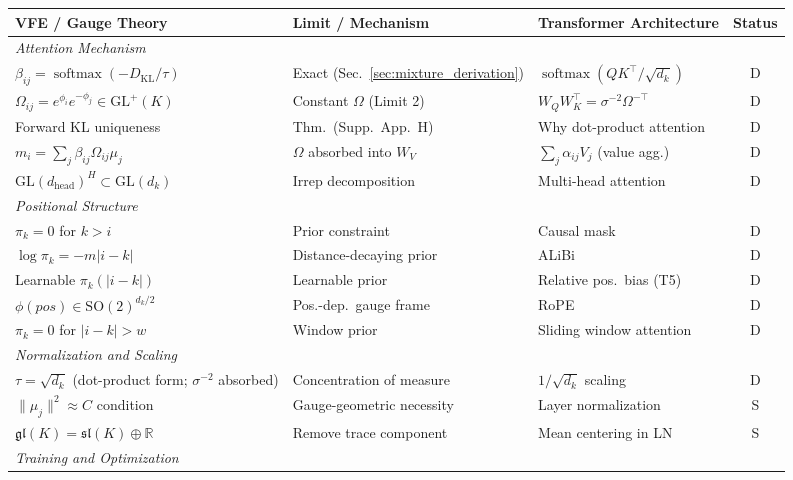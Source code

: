 \documentclass[twoside,11pt]{article}
\newcommand{\softmax}{\operatorname{softmax}}
\newcommand{\KL}{\operatorname{KL}}
\begin{document}
\begin{table}[p]
\centering
\renewcommand{\arraystretch}{1.15}
\setlength{\tabcolsep}{4pt}
\small
\begin{tabular}{|l|l|l|c|}
\hline
\textbf{VFE / Gauge Theory} & \textbf{Limit / Mechanism} & \textbf{Transformer Architecture} & \textbf{Status} \\
\hline
\multicolumn{4}{|l|}{\textit{Attention Mechanism}} \\
\hline
$\beta_{ij} \!=\! \softmax(-D_{\KL}/\tau)$ & Exact (Sec.~\ref{sec:mixture_derivation}) & $\softmax(QK^\top\!/\!\sqrt{d_k})$ & D \\
$\Omega_{ij}\!=\!e^{\phi_i}e^{-\phi_j}\!\in\!\mathrm{GL}^+(K)$ & Constant $\Omega$ (Limit 2) & $W_Q W_K^\top\!=\!\sigma^{-2}\Omega^{-\top}$ & D \\
Forward KL uniqueness & Thm.\ (Supp.~App.~H) & Why dot-product attention & D \\
$m_i \!=\! \sum_j \beta_{ij}\Omega_{ij}\mu_j$ & $\Omega$ absorbed into $W_V$ & $\sum_j \alpha_{ij} V_j$ (value agg.) & D \\
$\mathrm{GL}(d_{\text{head}})^H \!\subset\! \mathrm{GL}(d_k)$ & Irrep decomposition & Multi-head attention & D \\
\hline
\multicolumn{4}{|l|}{\textit{Positional Structure}} \\
\hline
$\pi_k = 0$ for $k > i$ & Prior constraint & Causal mask & D \\
$\log\pi_k = -m|i\!-\!k|$ & Distance-decaying prior & ALiBi & D \\
Learnable $\pi_k(|i\!-\!k|)$ & Learnable prior & Relative pos.\ bias (T5) & D \\
$\phi(pos) \!\in\! \mathrm{SO}(2)^{d_k/2}$ & Pos.-dep.\ gauge frame & RoPE & D \\
$\pi_k = 0$ for $|i\!-\!k|>w$ & Window prior & Sliding window attention & D \\
\hline
\multicolumn{4}{|l|}{\textit{Normalization and Scaling}} \\
\hline
$\tau = \sqrt{d_k}$ (dot-product form; $\sigma^{-2}$ absorbed) & Concentration of measure & $1/\sqrt{d_k}$ scaling & D \\
$\|\mu_j\|^2 \approx C$ condition & Gauge-geometric necessity & Layer normalization & S \\
$\mathfrak{gl}(K) \!=\! \mathfrak{sl}(K) \oplus \mathbb{R}$ & Remove trace component & Mean centering in LN & S \\
\hline
\multicolumn{4}{|l|}{\textit{Training and Optimization}} \\

\end{tabular}
\end{table}
\end{document}
